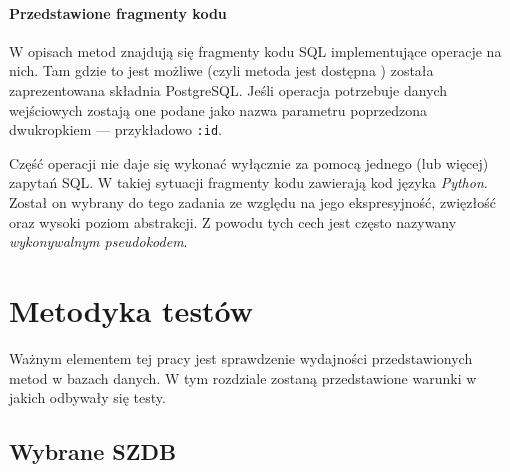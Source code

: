 \paragraph{Przedstawione fragmenty kodu} 
W opisach metod znajdują się fragmenty kodu SQL implementujące operacje na nich. 
Tam gdzie to jest możliwe (czyli metoda jest dostępna ) została zaprezentowana składnia PostgreSQL.
Jeśli operacja potrzebuje danych wejściowych zostają one podane jako nazwa parametru poprzedzona dwukropkiem --- przykładowo \texttt{:id}.



Część operacji nie daje się wykonać wyłącznie za pomocą jednego (lub więcej) zapytań SQL.
W takiej sytuacji fragmenty kodu zawierają kod języka \emph{Python}.
Został on wybrany do tego zadania ze względu na jego ekspresyjność, zwięzłość oraz wysoki poziom abstrakcji.
Z powodu tych cech jest często nazywany \emph{wykonywalnym pseudokodem}.








\section{Metodyka testów}

Ważnym elementem tej pracy jest sprawdzenie wydajności przedstawionych metod w bazach danych.
W tym rozdziale zostaną przedstawione warunki w jakich odbywały się testy.

\subsection*{Wybrane SZDB}

